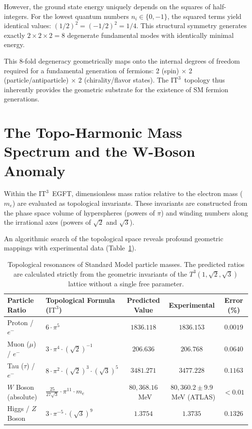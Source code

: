 \documentclass[onecolumn,aps,prd,superscriptaddress,nofootinbib,amsmath,amssymb]{revtex4-2}
\newcommand{\ITthree}{\ensuremath{\mathrm{IT}^3}}
\begin{document}
However, the ground state energy uniquely depends on the squares of half-integers. For the lowest quantum numbers $n_i \in \{0, -1\}$, the squared terms yield identical values: $(1/2)^2 = (-1/2)^2 = 1/4$. This structural symmetry generates exactly $2 \times 2 \times 2 = 8$ degenerate fundamental modes with identically minimal energy.

This 8-fold degeneracy geometrically maps onto the internal degrees of freedom required for a fundamental generation of fermions: 2 (spin) $\times$ 2 (particle/antiparticle) $\times$ 2 (chirality/flavor states). The \ITthree\ topology thus inherently provides the geometric substrate for the existence of SM fermion generations.

\section{The Topo-Harmonic Mass Spectrum and the W-Boson Anomaly}
Within the \ITthree\ EGFT, dimensionless mass ratios relative to the electron mass ($m_e$) are evaluated as topological invariants. These invariants are constructed from the phase space volume of hyperspheres (powers of $\pi$) and winding numbers along the irrational axes (powers of $\sqrt{2}$ and $\sqrt{3}$).

An algorithmic search of the topological space reveals profound geometric mappings with experimental data (Table~\ref{tab:mass_spectrum}).

\begin{table}[ht]
\caption{\label{tab:mass_spectrum} Topological resonances of Standard Model particle masses. The predicted ratios are calculated strictly from the geometric invariants of the $T^3(1,\sqrt{2},\sqrt{3})$ lattice without a single free parameter.}
\begin{ruledtabular}
\begin{tabular}{llccc}
\toprule
Particle Ratio & Topological Formula (\ITthree) & Predicted Value & Experimental & Error (\%) \\
\midrule
Proton / $e^-$ & $6 \cdot \pi^5$ & $1836.118$ & $1836.153$ & $0.0019$ \\
Muon ($\mu$) / $e^-$ & $3 \cdot \pi^4 \cdot (\sqrt{2})^{-1}$ & $206.636$ & $206.768$ & $0.0640$ \\
Tau ($\tau$) / $e^-$ & $8 \cdot \pi^2 \cdot (\sqrt{2})^3 \cdot (\sqrt{3})^5$ & $3481.271$ & $3477.228$ & $0.1163$ \\
$W$ Boson (absolute) & $\frac{25}{27\sqrt{3}} \cdot \pi^{11} \cdot m_e$ & $80,368.16$~MeV & $80,360.2 \pm 9.9$~MeV (ATLAS) & $< 0.01$ \\
Higgs / $Z$ Boson & $3 \cdot \pi^{-5} \cdot (\sqrt{3})^9$ & $1.3754$ & $1.3735$ & $0.1326$ \\
\bottomrule
\end{tabular}
\end{ruledtabular}
\end{table}
\end{document}
